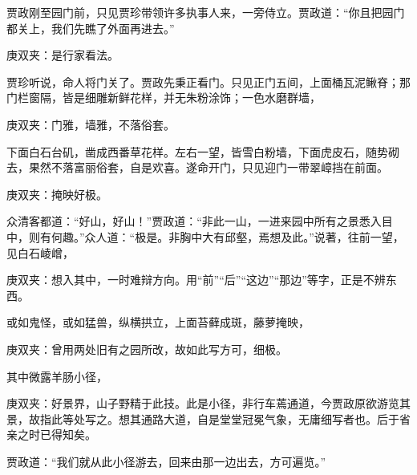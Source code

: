 \begin{parag}
    贾政刚至园门前，只见贾珍带领许多执事人来，一旁侍立。贾政道：“你且把园门都关上，我们先瞧了外面再进去。”\begin{note}庚双夹：是行家看法。\end{note}贾珍听说，命人将门关了。贾政先秉正看门。只见正门五间，上面桶瓦泥鳅脊；那门栏窗隔，皆是细雕新鲜花样，并无朱粉涂饰；一色水磨群墙，\begin{note}庚双夹：门雅，墙雅，不落俗套。\end{note}下面白石台矶，凿成西番草花样。左右一望，皆雪白粉墙，下面虎皮石，随势砌去，果然不落富丽俗套，自是欢喜。遂命开门，只见迎门一带翠嶂挡在前面。\begin{note}庚双夹：掩映好极。\end{note}众清客都道：“好山，好山！”贾政道：“非此一山，一进来园中所有之景悉入目中，则有何趣。”众人道：“极是。非胸中大有邱壑，焉想及此。”说著，往前一望，见白石崚嶒，\begin{note}庚双夹：想入其中，一时难辩方向。用“前”“后”“这边”“那边”等字，正是不辨东西。\end{note}或如鬼怪，或如猛兽，纵横拱立，上面苔藓成斑，藤萝掩映，\begin{note}庚双夹：曾用两处旧有之园所改，故如此写方可，细极。\end{note}其中微露羊肠小径，\begin{note}庚双夹：好景界，山子野精于此技。此是小径，非行车蔫通道，今贾政原欲游览其景，故指此等处写之。想其通路大道，自是堂堂冠冕气象，无庸细写者也。后于省亲之时已得知矣。\end{note}贾政道：“我们就从此小径游去，回来由那一边出去，方可遍览。”
\end{parag}


